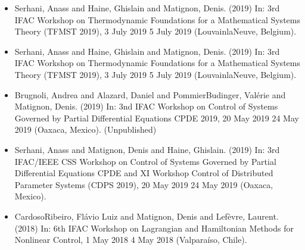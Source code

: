 \documentclass[letterpaper,10pt,english]{sphinxmanual}
\begin{document}
\begin{itemize}
\item {} 
\sphinxAtStartPar
Serhani, Anass and Haine, Ghislain and Matignon, Denis.  (2019) In: 3rd IFAC Workshop on Thermodynamic Foundations for a Mathematical Systems Theory (TFMST 2019), 3 July 2019 \sphinxhyphen{} 5 July 2019 (Louvain\sphinxhyphen{}la\sphinxhyphen{}Neuve, Belgium).

\item {} 
\sphinxAtStartPar
Serhani, Anass and Haine, Ghislain and Matignon, Denis.  (2019) In: 3rd IFAC Workshop on Thermodynamic Foundations for a Mathematical Systems Theory (TFMST 2019), 3 July 2019 \sphinxhyphen{} 5 July 2019 (Louvain\sphinxhyphen{}la\sphinxhyphen{}Neuve, Belgium).

\item {} 
\sphinxAtStartPar
Brugnoli, Andrea and Alazard, Daniel and Pommier\sphinxhyphen{}Budinger, Valérie and Matignon, Denis.  (2019) In: 3nd IFAC Workshop on Control of Systems Governed by Partial Differential Equations CPDE 2019, 20 May 2019 \sphinxhyphen{} 24 May 2019 (Oaxaca, Mexico). (Unpublished)

\item {} 
\sphinxAtStartPar
Serhani, Anass and Matignon, Denis and Haine, Ghislain.  (2019) In: 3rd IFAC/IEEE CSS Workshop on Control of Systems Governed by Partial Differential Equations CPDE and XI Workshop Control of Distributed Parameter Systems (CDPS 2019), 20 May 2019 \sphinxhyphen{} 24 May 2019 (Oaxaca, Mexico).

\item {} 
\sphinxAtStartPar
Cardoso\sphinxhyphen{}Ribeiro, Flávio Luiz and Matignon, Denis and Lefèvre, Laurent.  (2018) In: 6th IFAC Workshop on Lagrangian and Hamiltonian Methods for Nonlinear Control, 1 May 2018 \sphinxhyphen{} 4 May 2018 (Valparaíso, Chile).


\end{itemize}
\end{document}
